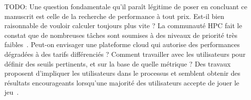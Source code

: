 
TODO: Une question fondamentale qu'il paraît légitime de poser en concluant ce manuscrit est celle de la recherche de performance à tout prix. Est-il bien raisonnable de vouloir calculer toujours plus vite ? La communauté \gls{HPC} fait le constat que de nombreuses tâches sont soumises à des niveaux de priorité très faibles~\cite{tirmaziBorgNextGeneration2020}. Peut-on envisager une plateforme cloud qui autorise des performances dégradées à des tarifs différenciés ? Comment travailler avec les utilisateurs pour définir des seuils pertinents, et sur la base de quelle métrique ? Des travaux proposent d'impliquer les utilisateurs dans le processus et semblent obtenir des résultats encourageants lorsqu'une majorité des utilisateurs accepte de jouer le jeu~\cite{mokhtariDigitalSustainabilityInvolving}.
